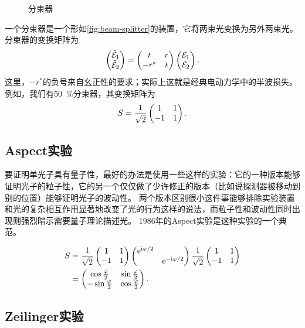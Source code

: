 \begin{figure}
    \centering
    
    \caption{分束器}
    \label{fig:beam-splitter}
\end{figure}

一个分束器是一个形如\autoref{fig:beam-splitter}的装置，它将两束光变换为另外两束光。分束器的变换矩阵为
\begin{equation}
    \pmqty{\tilde{\mathcal{E}}_1 \\ \tilde{\mathcal{E}}_2} = \pmqty{t & r \\ - r^* & t} \pmqty{\mathcal{E}_1 \\ \mathcal{E}_2}.
\end{equation}
这里，$-r^*$的负号来自幺正性的要求；实际上这就是经典电动力学中的半波损失。
例如，我们有\SI{50}{\percent}分束器，其变换矩阵为
\begin{equation}
    S = \frac{1}{\sqrt{2}} \pmqty{1 & 1 \\ -1 & 1}.
\end{equation}

\subsection{Aspect实验}

要证明单光子具有量子性，最好的办法是使用一些这样的实验：它的一种版本能够证明光子的粒子性，它的另一个仅仅做了少许修正的版本（比如说探测器被移动到别的位置）能够证明光子的波动性。
两个版本区别很小这件事能够排除实验装置和光的复杂相互作用显著地改变了光的行为这样的说法，而粒子性和波动性同时出现则强烈暗示需要量子理论描述光。
1986年的Aspect实验是这种实验的一个典范。

\begin{equation}
    \begin{aligned}
        S &= \frac{1}{\sqrt{2}} \pmqty{1 & 1 \\ -1 & 1} \pmqty{ \dmat{\ee^{\ii \varphi / 2}, \ee^{- \ii \varphi / 2}} } \frac{1}{\sqrt{2}} \pmqty{1 & 1 \\ -1 & 1}  \\
        &= \pmqty{\cos\frac{\varphi}{2} & \sin\frac{\varphi}{2} \\ - \sin\frac{\varphi}{2} & \cos\frac{\varphi}{2}}.
    \end{aligned}
\end{equation}

\subsection{Zeilinger实验}

